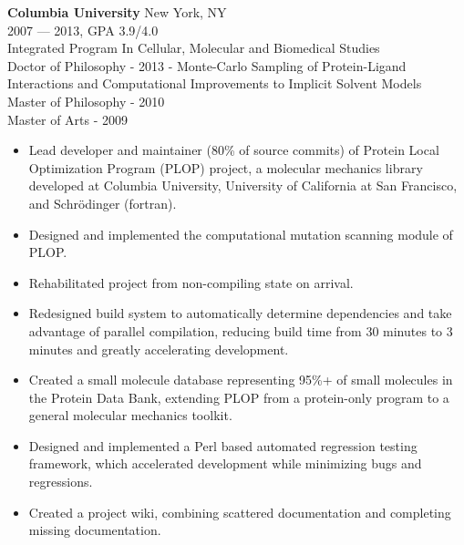 \myfontsize{\bigheader}
\textbf{Columbia University}
\myfontsize{\bodysize}
New York, NY\\
2007 --- 2013, GPA 3.9/4.0\\
Integrated Program In Cellular, Molecular and Biomedical Studies\\
Doctor of Philosophy - 2013 - Monte-Carlo Sampling of Protein-Ligand Interactions and Computational Improvements to Implicit Solvent Models\\
Master of Philosophy - 2010\\
Master of Arts - 2009\\

\begin{itemize}[topsep=1ex, partopsep=0ex, parsep=0ex, itemsep=0.5ex]
    \item Lead developer and maintainer ({\mytilde}80\% of source commits) of Protein Local Optimization Program (PLOP) project, a molecular mechanics library developed at Columbia University, University of California at San Francisco, and Schr\"{o}dinger (fortran).
    \item Designed and implemented the computational mutation scanning module of PLOP.
    \item Rehabilitated project from non-compiling state on arrival.
    \item Redesigned build system to automatically determine dependencies and take advantage of parallel compilation, reducing build time from {\mytilde}30 minutes to {\mytilde}3 minutes and greatly accelerating development.
    \item Created a small molecule database representing 95\%+ of small molecules in the Protein Data Bank, extending PLOP from a protein-only program to a general molecular mechanics toolkit.
    \item Designed and implemented a Perl based automated regression testing framework, which accelerated development while minimizing bugs and regressions.
    \item Created a project wiki, combining scattered documentation and completing missing documentation.
\end{itemize}

\vspace{\littleskip}




